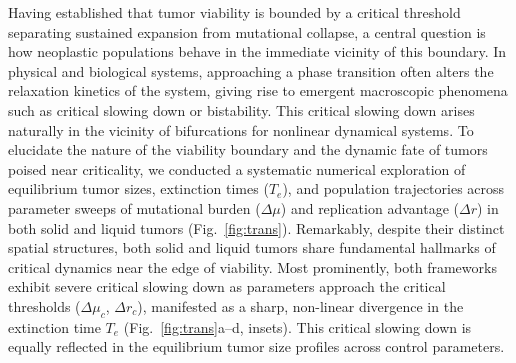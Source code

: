 \documentclass[10pt, aps, rmp,  twocolumn, superscriptaddress, floatfix, showkeys]{revtex4-2}
\begin{document}
Having established that tumor viability is bounded by a critical threshold separating sustained expansion from mutational collapse, a central question is how neoplastic populations behave in the immediate vicinity of this boundary. In physical and biological systems, approaching a phase transition often alters the relaxation kinetics of the system, giving rise to emergent macroscopic phenomena such as critical slowing down or bistability. This critical slowing down arises naturally in the vicinity of bifurcations for nonlinear dynamical systems. To elucidate the nature of the viability boundary and the dynamic fate of tumors poised near criticality, we conducted a systematic numerical exploration of equilibrium tumor sizes, extinction times ($T_e$), and population trajectories across parameter sweeps of mutational burden ($\Delta \mu$) and replication advantage ($\Delta r$) in both solid and liquid tumors (Fig.~\ref{fig:trans}).
Remarkably, despite their distinct spatial structures, both solid and liquid tumors share fundamental hallmarks of critical dynamics near the edge of viability. Most prominently, both frameworks exhibit severe critical slowing down as parameters approach the critical thresholds ($\Delta \mu_c$, $\Delta r_c$), manifested as a sharp, non-linear divergence in the extinction time $T_e$ (Fig.~\ref{fig:trans}a--d, insets). This critical slowing down is equally reflected in the equilibrium tumor size profiles across control parameters. 
\end{document}
